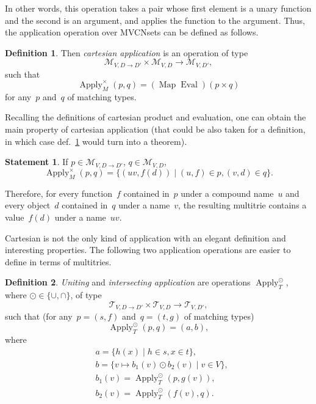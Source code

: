 \documentclass{article}
\theoremstyle{definition}
\newtheorem{Df}{Definition}
\newtheorem{St}{Statement}
\newcommand{\setcharmvcn}{M}
\newcommand{\setcharmt}{T}
\newcommand{\setsymbol}[3]{\mathcal{#1}_{#2,#3}}
\newcommand{\setmvcn}[2]{\setsymbol{\setcharmvcn}{#1}{#2}}
\newcommand{\setmt}[2]{\setsymbol{\setcharmt}{#1}{#2}}
\newcommand{\fmap}{\operatorname{Map}}
\newcommand{\apply}{\operatorname{Apply}}
\newcommand{\eval}{\operatorname{Eval}}
\begin{document}
In other words, this operation takes a pair whose first element is a unary
function and the second is an argument, and applies the function to the
argument. Thus, the application operation over MVCNsets can be defined as
follows.

\begin{Df}\label{df:mvcn-apply-cartesian}
Then \emph{cartesian application} is an operation of type
\[
\setmvcn{V}{D\to D'} \times \setmvcn{V}{D} \to \setmvcn{V}{D'} ,
\]
such that
\[
  \apply_{\setcharmvcn}^{\times} (p, q) = (\fmap \eval) (p \times q)
\]
for any~$p$ and~$q$ of matching types.
\end{Df}

Recalling the definitions of cartesian product and evaluation, one can
obtain the main property of cartesian application (that could be also taken
for a definition, in which case def.~\ref{df:mvcn-apply-cartesian} would turn
into a theorem).
 
\begin{St}\label{st:mvcn-apply-cartesian}
If $p\in \setmvcn{V}{D\to D'}$, $q\in \setmvcn{V}{D}$,
\[
  \apply_{\setcharmvcn}^{\times} (p, q) =
    \{ (uv, f(d)) \mid (u,f) \in p, (v,d) \in q \} .
\]
\end{St}

Therefore, for every function~$f$ contained in~$p$ under a compound name~$u$
and every object~$d$ contained in~$q$ under a name~$v$, the resulting
multitrie contains a value~$f(d)$ under a name~$uv$.

Cartesian is not the only kind of application with an elegant definition and
interesting properties.  The following two application operations are
easier to define in terms of multitries.

\begin{Df}\label{df:mt-apply-setop}
\emph{Uniting} and \emph{intersecting application} are operations
$\apply_{\setcharmt}^{\odot}$, where $\odot \in \{\cup, \cap \}$, of type
\[
  \setmt{V}{D\to D'} \times \setmt{V}{D} \to \setmt{V}{D'},
\]
such that (for any~$p = (s, f)$ and~$q = (t, g)$ of matching types)
\[
  \apply_{\setcharmt}^{\odot} (p, q) = (a, b) ,
\]
where
\begin{eqnarray*}
  & a      = \{ h(x) \mid h \in s, x \in t \} , \\
  & b      = \{ v \mapsto b_1(v) \odot b_2(v) \mid v \in V \}, \\
  & b_1(v) = \apply_{\setcharmt}^{\odot}(p, g(v)), \\
  & b_2(v) = \apply_{\setcharmt}^{\odot}(f(v), q) .
\end{eqnarray*}
\end{Df}
\end{document}
